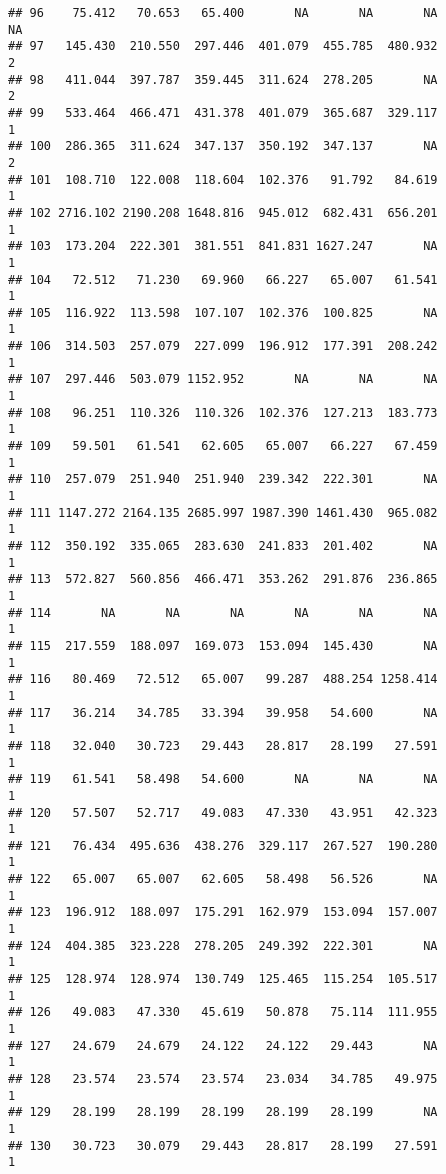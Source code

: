 \documentclass[
]{article}
\begin{document}
\begin{verbatim}
## 96    75.412   70.653   65.400       NA       NA       NA            NA
## 97   145.430  210.550  297.446  401.079  455.785  480.932             2
## 98   411.044  397.787  359.445  311.624  278.205       NA             2
## 99   533.464  466.471  431.378  401.079  365.687  329.117             1
## 100  286.365  311.624  347.137  350.192  347.137       NA             2
## 101  108.710  122.008  118.604  102.376   91.792   84.619             1
## 102 2716.102 2190.208 1648.816  945.012  682.431  656.201             1
## 103  173.204  222.301  381.551  841.831 1627.247       NA             1
## 104   72.512   71.230   69.960   66.227   65.007   61.541             1
## 105  116.922  113.598  107.107  102.376  100.825       NA             1
## 106  314.503  257.079  227.099  196.912  177.391  208.242             1
## 107  297.446  503.079 1152.952       NA       NA       NA             1
## 108   96.251  110.326  110.326  102.376  127.213  183.773             1
## 109   59.501   61.541   62.605   65.007   66.227   67.459             1
## 110  257.079  251.940  251.940  239.342  222.301       NA             1
## 111 1147.272 2164.135 2685.997 1987.390 1461.430  965.082             1
## 112  350.192  335.065  283.630  241.833  201.402       NA             1
## 113  572.827  560.856  466.471  353.262  291.876  236.865             1
## 114       NA       NA       NA       NA       NA       NA             1
## 115  217.559  188.097  169.073  153.094  145.430       NA             1
## 116   80.469   72.512   65.007   99.287  488.254 1258.414             1
## 117   36.214   34.785   33.394   39.958   54.600       NA             1
## 118   32.040   30.723   29.443   28.817   28.199   27.591             1
## 119   61.541   58.498   54.600       NA       NA       NA             1
## 120   57.507   52.717   49.083   47.330   43.951   42.323             1
## 121   76.434  495.636  438.276  329.117  267.527  190.280             1
## 122   65.007   65.007   62.605   58.498   56.526       NA             1
## 123  196.912  188.097  175.291  162.979  153.094  157.007             1
## 124  404.385  323.228  278.205  249.392  222.301       NA             1
## 125  128.974  128.974  130.749  125.465  115.254  105.517             1
## 126   49.083   47.330   45.619   50.878   75.114  111.955             1
## 127   24.679   24.679   24.122   24.122   29.443       NA             1
## 128   23.574   23.574   23.574   23.034   34.785   49.975             1
## 129   28.199   28.199   28.199   28.199   28.199       NA             1
## 130   30.723   30.079   29.443   28.817   28.199   27.591             1

\end{verbatim}
\end{document}

